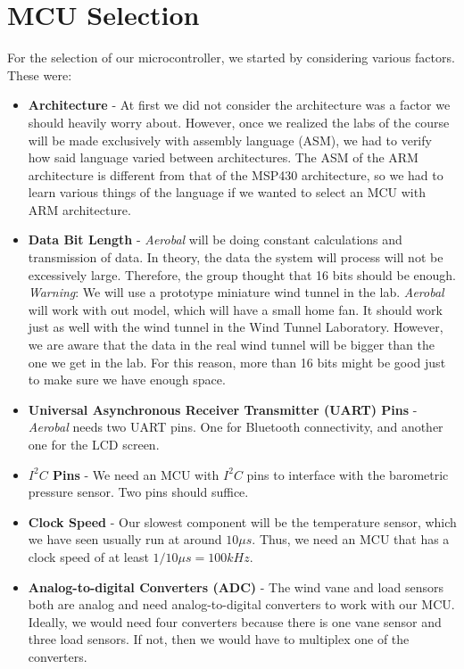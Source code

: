 \section{MCU Selection}
	For the selection of our microcontroller, we started by considering various factors. These were: 
	
	\begin{itemize}
	\item \textbf{Architecture} - At first we did not consider the architecture was a factor we should heavily worry about. However, once we realized the labs of the course will be made exclusively with assembly language (ASM), we had to verify how said language varied between architectures. The ASM of the ARM architecture is different from that of the MSP430 architecture, so we had to learn various things of the language if we wanted to select an MCU with ARM architecture. 	
	
  	\item \textbf{Data Bit Length} - \textit{Aerobal} will be doing constant calculations and transmission of data. In theory, the data  the system will process will not be excessively large. Therefore, the group thought that 16 bits should be enough. \textit{Warning}: We will use a prototype miniature wind tunnel in the lab. \textit{Aerobal} will work with out model, which will have a small home fan. It should work just as well with the wind tunnel in the Wind Tunnel Laboratory. However, we are aware that the data in the real wind tunnel will be bigger than the one we get in the lab. For this reason, more than 16 bits might be good just to make sure we have enough space.
  	
 	\item \textbf{Universal Asynchronous Receiver Transmitter (UART) Pins} - \textit{Aerobal} needs two UART pins. One for Bluetooth connectivity, and another one for the LCD screen. 
 	
  	\item \textbf{$I^2C$ Pins} - We need an MCU with $I^2C$ pins to interface with the barometric pressure sensor. Two pins should suffice.
  	
 	\item \textbf{Clock Speed} - Our slowest component will be the temperature sensor, which we have seen usually run at around $ 10\mu s $. Thus, we need an MCU that has a clock speed of at least $ 1 /  10\mu s = 100kHz$. 
 	
  	\item \textbf{Analog-to-digital Converters (ADC)} - The wind vane and load sensors both are analog and need analog-to-digital converters to work with our MCU. Ideally, we would need four converters because there is one vane sensor and three load sensors. If not, then we would have to multiplex one of the converters.
  	

\end{itemize}
